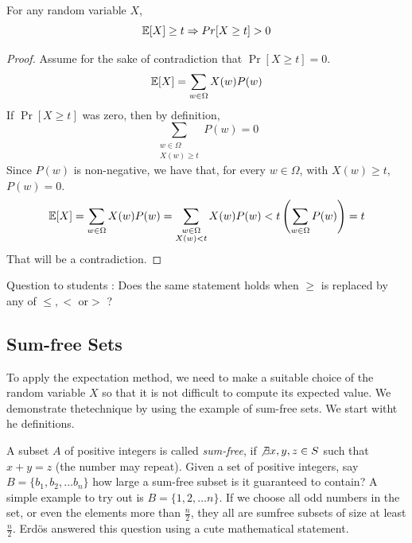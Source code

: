 \begin{lemma}
\label{lem:expectation-method}
For any random variable $X$, 
$${\mathbb E}[X] \ge t \Rightarrow Pr[X \ge t] > 0$$
\end{lemma}

\begin{proof}
Assume for the sake of contradiction that $\Pr[X \ge t] = 0$. 
$${\mathbb E}[X] = \sum_{w \in \Omega} X(w)P(w)$$
If $\Pr[X \ge t]$ was zero, then by definition, $$\sum_{\substack{w \in \Omega \\ X(w) \ge t}} P(w) = 0$$ 
Since $P(w)$ is non-negative, we have that, for every $w \in \Omega$, with $X(w) \ge t$, $P(w) = 0$.
$${\mathbb E}[X] = \sum_{w \in \Omega} X(w)P(w) = \sum_{\substack{w \in \Omega \\ X(w) < t}} X(w)P(w) < t \left( \sum_{\substack{w \in \Omega}} P(w) \right) = t$$
That will be a contradiction.

\end{proof}
\noindent Question to students : Does the same statement holds when $\ge$ is replaced by any of $\le,<$ or$ >$ ?

\subsection{Sum-free Sets}

To apply the expectation method, we need to make a suitable choice of the random variable $X$ so that it is not difficult to compute its expected value. We demonstrate thetechnique by using the example of sum-free sets. We start witht he definitions.

A subset $A$ of positive integers is called \textit{sum-free}, if $\not\exists x,y,z \in S$ such that $x+y = z$ (the number may repeat). Given a set of positive integers, say $B = \{b_1,b_2, \ldots b_n\}$ how large a sum-free subset is it guaranteed to contain? 
A simple example to try out is $B = \{1,2,\ldots n\}$. If we choose all odd numbers in the set, or even the elements more than $\frac{n}{2}$, they all are sumfree subsets of size at least $\frac{n}{2}$.
Erd\"os answered this question using a cute mathematical statement.

